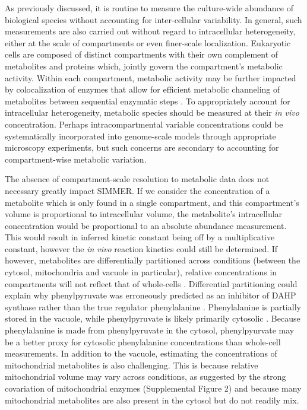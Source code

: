As previously discussed, it is routine to measure the culture-wide abundance of biological species without accounting for inter-cellular variability. In general, such measurements are also carried out without regard to intracellular heterogeneity, either at the scale of compartments or even finer-scale localization. Eukaryotic cells are composed of distinct compartments with their own complement of metabolites and proteins which, jointly govern the compartment's metabolic activity. Within each compartment, metabolic activity may be further impacted by colocalization of enzymes that allow for efficient metabolic channeling of metabolites between sequential enzymatic steps \cite{Ovadi:1995wy}. To appropriately account for intracellular heterogeneity, metabolic species should be measured at their \textit{in vivo} concentration. Perhaps intracompartmental variable concentrations could be systematically incorporated into genome-scale models through appropriate microscopy experiments, but such concerns are secondary to accounting for compartment-wise metabolic variation.

The absence of compartment-scale resolution to metabolic data does not necessary greatly impact SIMMER. If we consider the concentration of a metabolite which is only found in a single compartment, and this compartment's volume is proportional to intracellular volume, the metabolite's intracellular concentration would be proportional to an absolute abundance measurement. This would result in inferred kinetic constant being off by a multiplicative constant, however the \textit{in vivo} reaction kinetics could still be determined. If however, metabolites are differentially partitioned across conditions (between the cytosol, mitochondria and vacuole in particular), relative concentrations in compartments will not reflect that of whole-cells \cite{Kitamoto:1988wc}. Differential partitioning could explain why phenylpyruvate was erroneously predicted as an inhibitor of DAHP synthase rather than the true regulator phenylalanine \cite{Schnappauf:1998ec}. Phenylalanine is partially stored in the vacuole, while phenylpyruvate is likely primarily cytosolic \cite{Kitamoto:1988wc} .  Because phenylalanine is made from phenylpyruvate in the cytosol, phenylpyurvate may be a better proxy for cytosolic phenylalanine concentrations than whole-cell measurements. In addition to the vacuole, estimating the concentrations of mitochondrial metabolites is also challenging. This is because relative mitochondrial volume may vary across conditions, as suggested by the strong covariation of mitochondrial enzymes (Supplemental Figure 2) and because many mitochondrial metabolites are also present in the cytosol but do not readily mix.  

